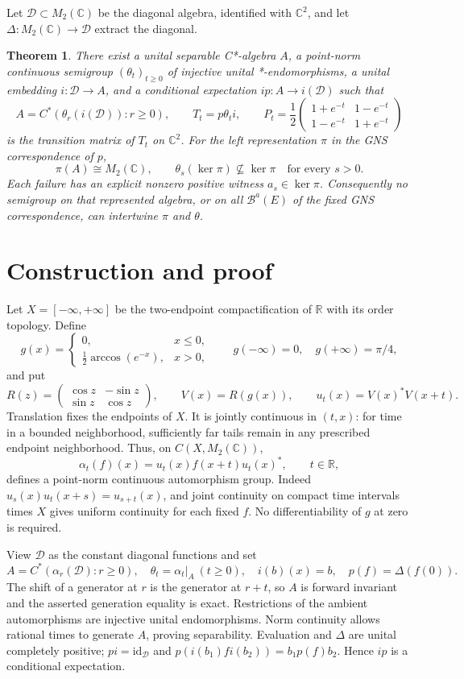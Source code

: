 \documentclass[11pt]{article}
\newtheorem{theorem}{Theorem}
\newcommand{\C}{\mathbb C}
\newcommand{\R}{\mathbb R}
\newcommand{\D}{\mathcal D}
\newcommand{\Ba}{\mathcal B^a}
\begin{document}
Let $\D\subset M_2(\C)$ be the diagonal algebra, identified with $\C^2$,
and let $\Delta:M_2(\C)\to\D$ extract the diagonal.
\begin{theorem}\label{thm:main}
There exist a unital separable C*-algebra $A$, a point-norm continuous
semigroup $(\theta_t)_{t\geq0}$ of injective unital *-endomorphisms,
a unital embedding $i:\D\to A$, and a conditional expectation
$ip:A\to i(\D)$ such that
\[
 A=C^*(\theta_r(i(\D)):r\geq0),\qquad
 T_t=p\theta_t i,\qquad
 P_t=\frac12\begin{pmatrix}1+e^{-t}&1-e^{-t}\\1-e^{-t}&1+e^{-t}\end{pmatrix}
\]
is the transition matrix of $T_t$ on $\C^2$.
For the left representation $\pi$ in the GNS correspondence of $p$,
\[
 \pi(A)\cong M_2(\C),\qquad
 \theta_s(\ker\pi)\not\subseteq\ker\pi\quad\text{for every }s>0.
\]
Each failure has an explicit nonzero positive witness $a_s\in\ker\pi$.
Consequently no semigroup on that represented algebra, or on all
$\Ba(E)$ of the fixed GNS correspondence, can intertwine $\pi$ and $\theta$.
\end{theorem}

\section*{Construction and proof}
Let $X=[-\infty,+\infty]$ be the two-endpoint compactification of $\R$
with its order topology. Define
\[
 g(x)=\begin{cases}0,&x\leq0,\\\tfrac12\arccos(e^{-x}),&x>0,\end{cases}
 \qquad g(-\infty)=0,\quad g(+\infty)=\pi/4,
\]
and put
\[
 R(z)=\begin{pmatrix}\cos z&-\sin z\\\sin z&\cos z\end{pmatrix},
 \qquad V(x)=R(g(x)),\qquad u_t(x)=V(x)^*V(x+t).
\]
Translation fixes the endpoints of $X$. It is jointly continuous in
$(t,x)$: for time in a bounded neighborhood, sufficiently far tails
remain in any prescribed endpoint neighborhood. Thus, on $C(X,M_2(\C))$,
\[
 \alpha_t(f)(x)=u_t(x)f(x+t)u_t(x)^*,\qquad t\in\R,
\]
defines a point-norm continuous automorphism group. Indeed
$u_s(x)u_t(x+s)=u_{s+t}(x)$, and joint continuity on compact time
intervals times $X$ gives uniform continuity for each fixed $f$.
No differentiability of $g$ at zero is required.

View $\D$ as the constant diagonal functions and set
\[
 A=C^*(\alpha_r(\D):r\geq0),\quad
 \theta_t=\alpha_t|_A\ (t\geq0),\quad i(b)(x)=b,\quad
 p(f)=\Delta(f(0)).
\]
The shift of a generator at $r$ is the generator at $r+t$, so $A$ is
forward invariant and the asserted generation equality is exact.
Restrictions of the ambient automorphisms are injective unital
endomorphisms. Norm continuity allows rational times to generate $A$,
proving separability. Evaluation and $\Delta$ are unital completely
positive; $pi=\mathrm{id}_{\D}$ and
$p(i(b_1)fi(b_2))=b_1p(f)b_2$. Hence $ip$ is a conditional expectation.
\end{document}
